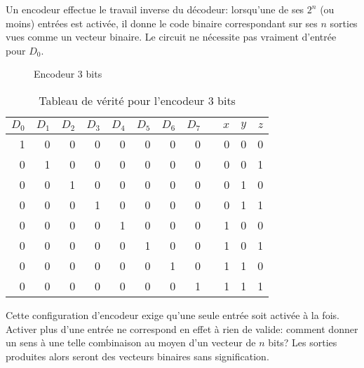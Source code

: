 \documentclass[letter, oneside]{book}
\begin{document}
Un encodeur effectue le travail inverse du décodeur: lorsqu'une de ses
\(2^n\) (ou moins) entrées est activée, il donne le code binaire
correspondant sur ses \(n\) sorties vues comme un vecteur binaire. Le
circuit ne nécessite pas vraiment d'entrée pour \(D_0\).


\begin{figure}[htbp]
\centering

\caption{\label{fig:org6193348}Encodeur 3 bits}
\end{figure}


\begin{table}[htbp]
\caption{\label{tab:org5b47c25}Tableau de vérité pour l'encodeur 3 bits}
\centering
\begin{tabular}{rrrrrrrrlrrr}
\(D_0\) & \(D_1\) & \(D_2\) & \(D_3\) & \(D_4\) & \(D_5\) & \(D_6\) & \(D_7\) &  & \(x\) & \(y\) & \(z\)\\[0pt]
\hline
1 & 0 & 0 & 0 & 0 & 0 & 0 & 0 &  & 0 & 0 & 0\\[0pt]
0 & 1 & 0 & 0 & 0 & 0 & 0 & 0 &  & 0 & 0 & 1\\[0pt]
0 & 0 & 1 & 0 & 0 & 0 & 0 & 0 &  & 0 & 1 & 0\\[0pt]
0 & 0 & 0 & 1 & 0 & 0 & 0 & 0 &  & 0 & 1 & 1\\[0pt]
0 & 0 & 0 & 0 & 1 & 0 & 0 & 0 &  & 1 & 0 & 0\\[0pt]
0 & 0 & 0 & 0 & 0 & 1 & 0 & 0 &  & 1 & 0 & 1\\[0pt]
0 & 0 & 0 & 0 & 0 & 0 & 1 & 0 &  & 1 & 1 & 0\\[0pt]
0 & 0 & 0 & 0 & 0 & 0 & 0 & 1 &  & 1 & 1 & 1\\[0pt]
\end{tabular}
\end{table}

Cette configuration d'encodeur exige qu'une seule entrée soit
activée à la fois. Activer plus d'une entrée ne correspond en effet à
rien de valide: comment donner un sens à une telle combinaison au
moyen d'un vecteur de \(n\) bits? Les sorties produites alors seront
des vecteurs binaires sans signification.
\end{document}
